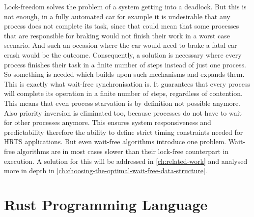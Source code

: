 Lock-freedom solves the problem of a system getting into a deadlock. But this is not enough, in a fully automated car for example it is undesirable that any process does not complete its task, since that could mean that some processes that are responsible for braking would not finish their work in a worst case scenario. And such an occasion where the car would need to brake a fatal car crash would be the outcome. Consequently, a solution is necessary where every process finishes their task in a finite number of steps instead of just one process. So something is needed which builds upon such mechanisms and expands them. This is exactly what wait-free synchronisation is. It guarantees that every process will complete its operation in a finite number of steps, regardless of contention. This means that even process starvation is by definition not possible anymore. Also priority inversion is eliminated too, because processes do not have to wait for other processes anymore. This ensures system responsiveness and predictability therefore the ability to define strict timing constraints needed for \ac{HRTS} applications. But even wait-free algorithms introduce one problem. Wait-free algorithms are in most cases slower than their lock-free counterpart in execution. A solution for this will be addressed in \cref{ch:related-work} and analysed more in depth in \cref{ch:choosing-the-optimal-wait-free-data-structure}.

\section{Rust Programming Language}\label{sec:rust}

